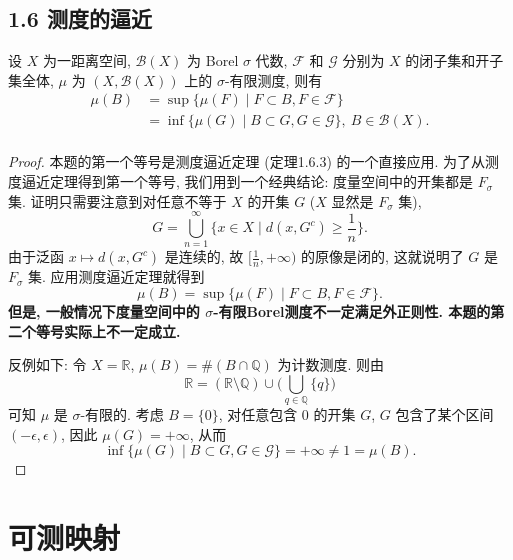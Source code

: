     \subsection{1.6 测度的逼近}
        \begin{1}
            设 $X$ 为一距离空间, $\mathcal{B}(X)$ 为 Borel $\sigma$ 代数, 
            $\mathcal{F}$ 和 $\mathcal{G}$ 分别为 $X$ 的闭子集和开子集全体, 
            $\mu$ 为 $(X,\mathcal{B}(X))$ 上的 $\sigma$-有限测度, 则有
            \[
            \begin{split}
                \mu(B)&=\sup\{\mu(F)\mid F\subset B, F\in\mathcal{F}\}\\
                &=\inf\{\mu(G)\mid B\subset G, G\in\mathcal{G}\},\ B\in\mathcal{B}(X).\\
            \end{split}
            \]
        \end{1}
        \begin{proof}
            本题的第一个等号是测度逼近定理 (定理1.6.3) 的一个直接应用. 
            为了从测度逼近定理得到第一个等号, 我们用到一个经典结论:  
            度量空间中的开集都是 $F_\sigma$ 集. 
            证明只需要注意到对任意不等于 $X$ 的开集 $G$ 
            ($X$ 显然是 $F_\sigma$ 集), 
            \[
                G=\bigcup_{n=1}^\infty\{x\in X\mid d(x,G^c)\geqslant\frac{1}{n}\}.
            \]
            由于泛函 $x\mapsto d(x,G^c)$ 是连续的, 
            故 $[\frac{1}{n},+\infty)$ 的原像是闭的, 
            这就说明了 $G$ 是 $F_\sigma$ 集. 
            应用测度逼近定理就得到
            \[
                \mu(B)=\sup\{\mu(F)\mid F\subset B, F\in\mathcal{F}\}.
            \]
            \textbf{但是, 一般情况下度量空间中的 $\sigma$-有限Borel测度不一定满足外正则性. 本题的第二个等号实际上不一定成立. }

            反例如下: 令 $X=\mathbb{R}$, $\mu(B)=\#(B\cap\mathbb{Q})$ 为计数测度. 
            则由
            \[
                \mathbb{R}=(\mathbb{R}\setminus\mathbb{Q})\cup\big(\displaystyle\bigcup_{q\in\mathbb{Q}}\{q\}\big)
            \]
            可知 $\mu$ 是 $\sigma$-有限的. 
            考虑 $B=\{0\}$, 对任意包含 $0$ 的开集 $G$, 
            $G$ 包含了某个区间 $(-\epsilon,\epsilon)$, 
            因此 $\mu(G)=+\infty$, 从而
            \[
                \inf\{\mu(G)\mid B\subset G, G\in\mathcal{G}\}=+\infty\not=1=\mu(B).
            \]

        \end{proof}
\section{可测映射}
